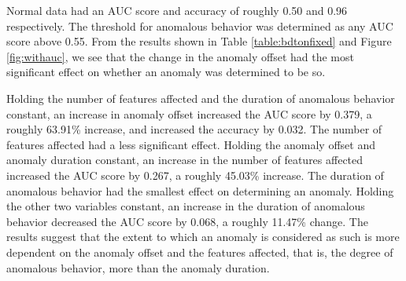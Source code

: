 \documentclass[5p]{elsarticle}
\begin{document}
Normal data had an AUC score and accuracy of roughly 0.50 and 0.96 respectively. The threshold for anomalous behavior was determined as any AUC score above 0.55. From the results shown in Table \ref{table:bdtonfixed} and Figure \ref{fig:withauc}, we see that the change in the anomaly offset had the most significant effect on whether an anomaly was determined to be so.

Holding the number of features affected and the duration of anomalous behavior constant, an increase in anomaly offset increased the AUC score by 0.379, a roughly 63.91\% increase, and increased the accuracy by 0.032. The number of features affected had a less significant effect. Holding the anomaly offset and anomaly duration constant, an increase in the number of features affected increased the AUC score by 0.267, a roughly 45.03\% increase. The duration of anomalous behavior had the smallest effect on determining an anomaly. Holding the other two variables constant, an increase in the duration of anomalous behavior decreased the AUC score by 0.068, a roughly 11.47\% change. The results suggest that the extent to which an anomaly is considered as such is more dependent on the anomaly offset and the features affected, that is, the degree of anomalous behavior, more than the anomaly duration.
\end{document}
